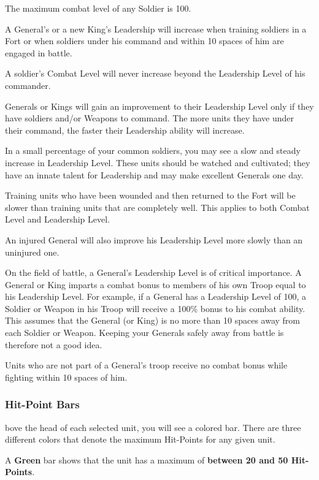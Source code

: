 The maximum combat level of any Soldier is 100.

A General’s or a new King’s Leadership will increase when training soldiers in a Fort or when soldiers under his command and within 10 spaces of him are engaged in battle.

A soldier’s Combat Level will never increase beyond the Leadership Level of his commander.

Generals or Kings will gain an improvement to their Leadership Level only if they have soldiers and/or Weapons to command. The more units they have under their command, the faster their Leadership ability will increase.

In a small percentage of your common soldiers, you may see a slow and steady increase in Leadership Level. These units should be watched and cultivated; they have an innate talent for Leadership and may make excellent Generals one day.

Training units who have been wounded and then returned to the Fort will be slower than training units that are completely well. This applies to both Combat Level and Leadership Level.

An injured General will also improve his Leadership Level more slowly than an uninjured one.

On the field of battle, a General’s Leadership Level is of critical importance. A General or King imparts a combat bonus to members of his own Troop equal to his Leadership Level. For example, if a General has a Leadership Level of 100, a Soldier or Weapon in his Troop will receive a 100\% bonus to his combat ability. This assumes that the General (or King) is no more than 10 spaces away from each Soldier or Weapon. Keeping your Generals safely away from battle is therefore not a good idea.

Units who are not part of a General’s troop receive no combat bonus while fighting within 10 spaces of him.

\subsubsection{Hit-Point Bars}


bove the head of each selected unit, you will see a colored bar. There are three different colors that denote the maximum Hit-Points for any given unit.

A \textbf{Green} bar shows that the unit has a maximum of \textbf{between 20 and 50 Hit-Points}.

